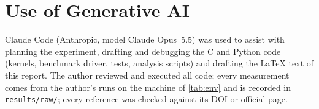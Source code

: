 \documentclass[conference,a4paper]{IEEEtran}
\begin{document}
\section*{Use of Generative AI}
Claude Code (Anthropic, model Claude Opus~5.5) was used to assist with planning the experiment, drafting and
debugging the C and Python code (kernels, benchmark driver, tests, analysis scripts) and drafting the
\LaTeX{} text of this report. The author reviewed and executed all code; every measurement comes from the
author's runs on the machine of \cref{tab:env} and is recorded in \texttt{results/raw/}; every reference was
checked against its DOI or official page.



\end{document}
